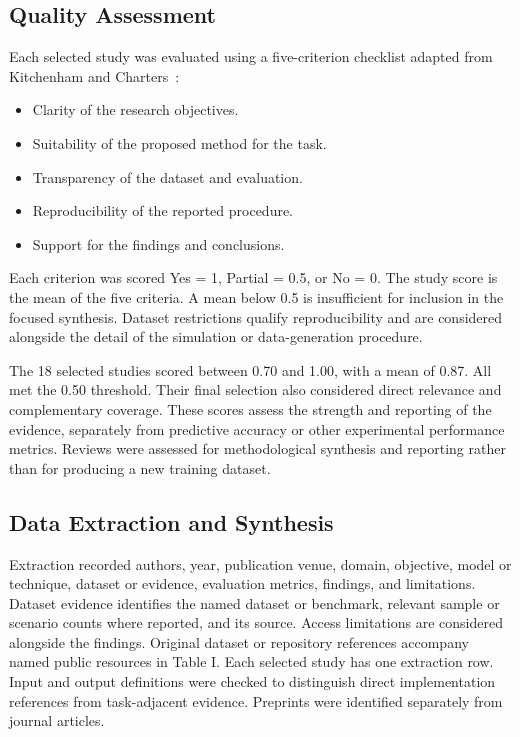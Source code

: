 \documentclass[journal,letterpaper]{IEEEtran}
\begin{document}
\subsection{Quality Assessment}
Each selected study was evaluated using a five-criterion checklist adapted from Kitchenham and Charters~\cite{Kitchenham}:
\begin{itemize}
\item Clarity of the research objectives.
\item Suitability of the proposed method for the task.
\item Transparency of the dataset and evaluation.
\item Reproducibility of the reported procedure.
\item Support for the findings and conclusions.
\end{itemize}
Each criterion was scored Yes = 1, Partial = 0.5, or No = 0. The study score is the mean of the five criteria. A mean below 0.5 is insufficient for inclusion in the focused synthesis. Dataset restrictions qualify reproducibility and are considered alongside the detail of the simulation or data-generation procedure.

The 18 selected studies scored between 0.70 and 1.00, with a mean of 0.87. All met the 0.50 threshold. Their final selection also considered direct relevance and complementary coverage. These scores assess the strength and reporting of the evidence, separately from predictive accuracy or other experimental performance metrics. Reviews were assessed for methodological synthesis and reporting rather than for producing a new training dataset.

\subsection{Data Extraction and Synthesis}
Extraction recorded authors, year, publication venue, domain, objective, model or technique, dataset or evidence, evaluation metrics, findings, and limitations. Dataset evidence identifies the named dataset or benchmark, relevant sample or scenario counts where reported, and its source. Access limitations are considered alongside the findings. Original dataset or repository references accompany named public resources in Table I. Each selected study has one extraction row. Input and output definitions were checked to distinguish direct implementation references from task-adjacent evidence. Preprints were identified separately from journal articles.
\end{document}
